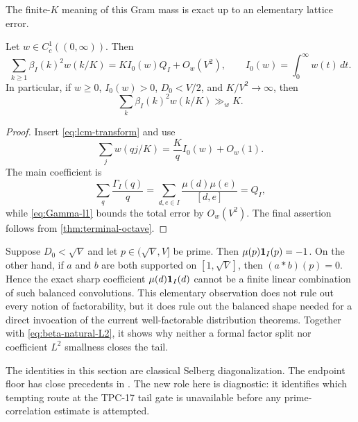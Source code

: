 The finite-$K$ meaning of this Gram mass is exact up to an elementary
lattice error.

\begin{proposition}
\label{prop:weighted-second-moment}
Let $w\in C_c^1((0,\infty))$.  Then
\begin{equation}
 \sum_{k\ge1}\beta_I(k)^2w(k/K)
 =K I_0(w)Q_I+O_w(V^2),
 \qquad I_0(w)=\int_0^\infty w(t)\,dt.
 \label{eq:weighted-beta-second-moment}
\end{equation}
In particular, if $w\ge0$, $I_0(w)>0$, $D_0<V/2$, and
$K/V^2\to\infty$, then
\begin{equation}
 \sum_k\beta_I(k)^2w(k/K)\gg_w K.
 \label{eq:beta-natural-L2}
\end{equation}
\end{proposition}

\begin{proof}
Insert \eqref{eq:lcm-transform} and use
\[
 \sum_jw(qj/K)=\frac Kq I_0(w)+O_w(1).
\]
The main coefficient is
\[
 \sum_q\frac{\Gamma_I(q)}q
 =\sum_{d,e\in I}\frac{\mu(d)\mu(e)}{[d,e]}=Q_I,
\]
while \eqref{eq:Gamma-l1} bounds the total error by $O_w(V^2)$.
The final assertion follows from \cref{thm:terminal-octave}.
\end{proof}

\begin{remark}
Suppose $D_0<\sqrt V$ and let $p\in(\sqrt V,V]$ be prime.  Then
$\mu(p)\mathbf 1_I(p)=-1$.  On the other hand, if $a$ and $b$ are both
supported on $[1,\sqrt V]$, then $(a*b)(p)=0$.  Hence the exact sharp
coefficient $\mu(d)\mathbf 1_I(d)$ cannot be a finite linear combination of
such balanced convolutions.  This elementary observation does not rule
out every notion of factorability, but it does rule out the balanced
shape needed for a direct invocation of the current well-factorable
distribution theorems.  Together with \eqref{eq:beta-natural-L2}, it
shows why neither a formal factor split nor coefficient $L^2$ smallness
closes the tail.
\end{remark}

The identities in this section are classical Selberg diagonalization.
The endpoint floor has close precedents in
\citet{DressIwaniecTenenbaum1983,deLaBretecheDressTenenbaum2020,RamareZunigaAlterman2026v3}.
The new role here is diagnostic: it identifies which tempting route at
the TPC-17 tail gate is unavailable before any prime-correlation
estimate is attempted.
